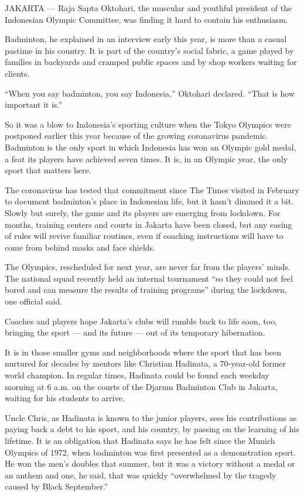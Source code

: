 JAKARTA --- Raja Sapta Oktohari, the muscular and youthful president of
the Indonesian Olympic Committee, was finding it hard to contain his
enthusiasm.

Badminton, he explained in an interview early this year, is more than a
casual pastime in his country. It is part of the country's social
fabric, a game played by families in backyards and cramped public spaces
and by shop workers waiting for clients.

``When you say badminton, you say Indonesia,'' Oktohari declared. ``That
is how important it is.''

So it was a blow to Indonesia's sporting culture when the Tokyo Olympics
were postponed earlier this year because of the growing coronavirus
pandemic. Badminton is the only sport in which Indonesia has won an
Olympic gold medal, a feat its players have achieved seven times. It is,
in an Olympic year, the only sport that matters here.

The coronavirus has tested that commitment since The Times visited in
February to document badminton's place in Indonesian life, but it hasn't
dimmed it a bit. Slowly but surely, the game and its players are
emerging from lockdown. For months, training centers and courts in
Jakarta have been closed, but any easing of rules will revive familiar
routines, even if coaching instructions will have to come from behind
masks and face shields.

The Olympics, rescheduled for next year, are never far from the players'
minds. The national squad recently held an internal tournament ``so they
could not feel bored and can measure the results of training programs''
during the lockdown, one official said.

Coaches and players hope Jakarta's clubs will rumble back to life soon,
too, bringing the sport --- and its future --- out of its temporary
hibernation.

It is in those smaller gyms and neighborhoods where the sport that has
been nurtured for decades by mentors like Christian Hadinata, a
70-year-old former world champion. In regular times, Hadinata could be
found each weekday morning at 6 a.m. on the courts of the Djarum
Badminton Club in Jakarta, waiting for his students to arrive.

Uncle Chris, as Hadinata is known to the junior players, sees his
contributions as paying back a debt to his sport, and his country, by
passing on the learning of his lifetime. It is an obligation that
Hadinata says he has felt since the Munich Olympics of 1972, when
badminton was first presented as a demonstration sport. He won the men's
doubles that summer, but it was a victory without a medal or an anthem
and one, he said, that was quickly ``overwhelmed by the tragedy caused
by Black September.''

